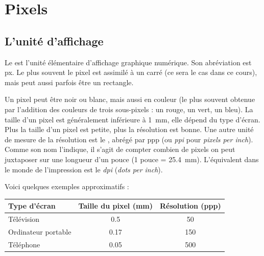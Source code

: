\documentclass[11pt,class=report,crop=false]{standalone}
\begin{document}

%
%
%




\section{Pixels}


\subsection{L'unité d'affichage}

Le  est l'unité élémentaire d'affichage graphique numérique.
Son abréviation est \og{}px\fg{}. Le plus souvent le pixel est assimilé à un carré (ce sera le cas dans ce cours), mais peut aussi parfois être un rectangle.


Un pixel peut être noir ou blanc, mais aussi en couleur (le plus souvent obtenue par l'addition des couleurs de trois sous-pixels : un rouge, un vert, un bleu).
La taille d'un pixel est généralement inférieure à \SI{1}{mm}, elle dépend du type d'écran.
Plus la taille d'un pixel est petite, plus la résolution est bonne.
Une autre unité de mesure de la résolution est le , abrégé par  \og{}ppp\fg{} (ou \emph{ppi} pour \emph{pixels per inch}).
Comme son nom l'indique, il s'agit de compter combien de pixels on peut juxtaposer sur une longueur d'un pouce (1 pouce = \SI{25.4}{mm}).
L'équivalent dans le monde de l'impression est le \emph{dpi} (\emph{dots per inch}).

Voici quelques exemples approximatifs :

\begin{center}
\begin{tabular}{lcc}
Type d'écran & Taille du pixel (mm) & Résolution (ppp) \\
\hline 
Télévision & 0.5 & 50 \\
Ordinateur portable & 0.17 & 150 \\ 
Téléphone & 0.05 & 500 \\
\end{tabular}
\end{center}
\end{document}
